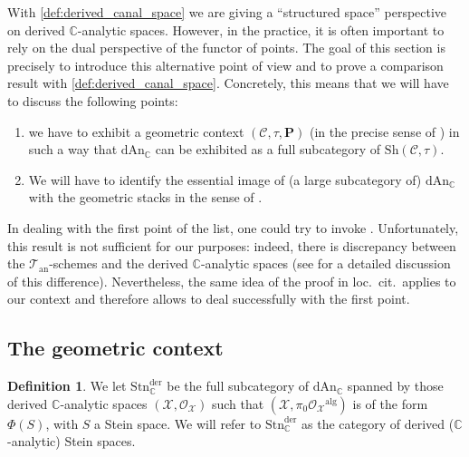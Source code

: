 \documentclass[12pt,a4paper,reqno]{amsart}
\theoremstyle{plain}
\theoremstyle{definition}
\newtheorem{defin}[thm]{Definition}
\theoremstyle{remark}
\numberwithin{equation}{section}
\begin{document}
With \cref{def:derived_canal_space} we are giving a ``structured space'' perspective on derived {$\mathbb C$-analytic\xspace} spaces.
However, in the practice, it is often important to rely on the dual perspective of the functor of points.
The goal of this section is precisely to introduce this alternative point of view and to prove a comparison result with \cref{def:derived_canal_space}.
Concretely, this means that we will have to discuss the following points:
\begin{enumerate}
	\item we have to exhibit a geometric context $({\mathcal C}, \tau, \mathbf P)$ (in the precise sense of \cite[Definition 2.11]{Porta_Yu_Higher_analytic_stacks_2014}) in such a way that ${\mathrm{dAn}_{\mathbb C}}$ can be exhibited as a full subcategory of ${\mathrm{Sh}}({\mathcal C}, \tau)$.
	\item We will have to identify the essential image of (a large subcategory of) ${\mathrm{dAn}_{\mathbb C}}$ with the geometric stacks in the sense of \cite[Definition 2.15]{Porta_Yu_Higher_analytic_stacks_2014}.
\end{enumerate}
In dealing with the first point of the list, one could try to invoke \cite[Theorem 2.4.1]{DAG-V}.
Unfortunately, this result is not sufficient for our purposes: indeed, there is discrepancy between the ${{\mathcal T}_{\mathrm{an}}}$-schemes and the derived {$\mathbb C$-analytic\xspace} spaces (see \cite[Corollary 12.22 and Proposition 12.23]{DAG-IX} for a detailed discussion of this difference).
Nevertheless, the same idea of the proof in loc.\ cit.\ applies to our context and therefore allows to deal successfully with the first point.

\subsection{The geometric context} \label{subsec:analytic_functor_of_points_I}

\begin{defin}
	We let ${\mathrm{Stn}^{\mathrm{der}}_{\mathbb C}}$ be the full subcategory of ${\mathrm{dAn}_{\mathbb C}}$ spanned by those derived {$\mathbb C$-analytic\xspace} spaces $({\mathcal X}, {\mathcal O}_{\mathcal X})$ such that $({\mathcal X}, \pi_0 {\mathcal O}_{\mathcal X}{^\mathrm{alg}})$ is of the form $\Phi(S)$, with $S$ a Stein space. We will refer to ${\mathrm{Stn}^{\mathrm{der}}_{\mathbb C}}$ as the category of derived ({$\mathbb C$-analytic\xspace}) Stein spaces.
\end{defin}
\end{document}

